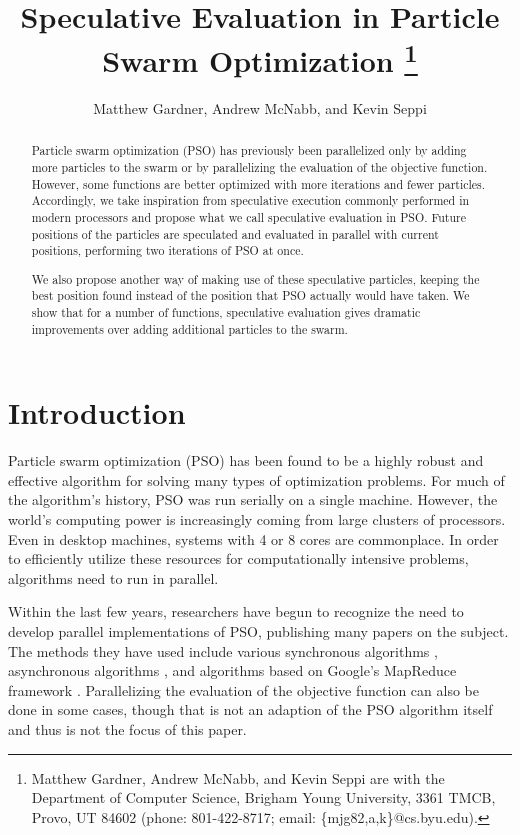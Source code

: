 \documentclass[journal,letterpaper]{IEEEtran}
\title{\ \\ \LARGE\bf Speculative Evaluation in Particle Swarm Optimization%
\thanks{Matthew Gardner, Andrew McNabb, and Kevin Seppi are with the Department
of Computer Science, Brigham Young University, 3361 TMCB, Provo, UT 84602
(phone: 801-422-8717; email: \{mjg82,a,k\}@cs.byu.edu).}%
}
\date{}
\author{Matthew Gardner, Andrew McNabb, and Kevin Seppi}
\begin{document}
\maketitle

\begin{abstract}

Particle swarm optimization (PSO) has previously been parallelized only by 
adding more particles to the swarm or by parallelizing the evaluation of the
objective function.  However, some functions are better optimized with more
iterations and fewer particles.  Accordingly, we take inspiration from 
speculative execution commonly performed in modern processors and propose what
we call speculative evaluation in PSO.  Future positions of the particles are
speculated and evaluated in parallel with current positions, performing two
iterations of PSO at once.

We also propose another way of making use of these speculative particles,
keeping the best position found instead of the position that PSO actually would
have taken.  We show that for a number of functions, speculative evaluation
gives dramatic improvements over adding additional particles to the swarm.

\end{abstract}

\section{Introduction}
\label{sec:intro}

Particle swarm optimization (PSO) has been found to be a highly robust and
effective algorithm for solving many types of optimization problems.  For much
of the algorithm's history, PSO was run serially on a single machine.  However,
the world's computing power is increasingly coming from large clusters of
processors.  Even in desktop machines, systems with 4 or 8 cores are
commonplace.  In order to efficiently utilize these resources for
computationally intensive problems, algorithms need to run in parallel.

Within the last few years, researchers have begun to recognize the need to
develop parallel implementations of PSO, publishing many papers on the subject.
The methods they have used include various synchronous algorithms
\cite{belal-ijicis04,chu-sci06,jin-aps05,parsopoulos-aia04,schutte-ijnme04},
asynchronous algorithms \cite{koh-ijnme06,mostaghim-report06,venter-wcsmo05},
and algorithms based on Google's MapReduce framework \cite{mcnabb-cec07}.
Parallelizing the evaluation of the objective function can also be done in some
cases, though that is not an adaption of the PSO algorithm itself and thus is
not the focus of this paper.
\end{document}
